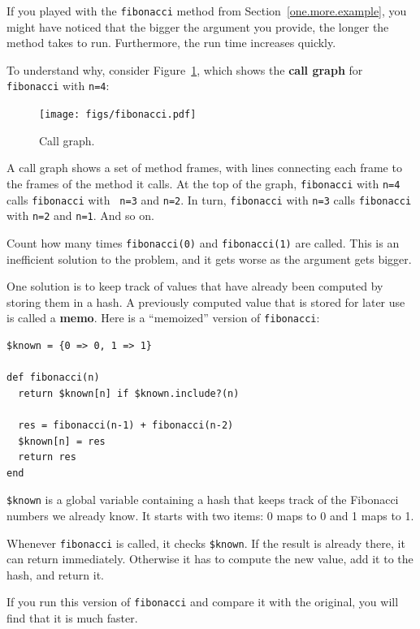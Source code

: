 \documentclass[10pt]{book}
\begin{document}
If you played with the {\tt fibonacci} method from
Section~\ref{one.more.example}, you might have noticed that the bigger
the argument you provide, the longer the method takes to run.
Furthermore, the run time increases quickly.

To understand why, consider Figure~\ref{fig.fibonacci}, which shows
the {\bf call graph} for {\tt fibonacci} with {\tt n=4}:

\begin{figure}
\centerline
{\texttt{[image: figs/fibonacci.pdf]}}
\caption{Call graph.}
\label{fig.fibonacci}
\end{figure}

A call graph shows a set of method frames, with lines connecting each
frame to the frames of the method it calls.  At the top of the
graph, {\tt fibonacci} with {\tt n=4} calls {\tt fibonacci} with {\tt
n=3} and {\tt n=2}.  In turn, {\tt fibonacci} with {\tt n=3} calls
{\tt fibonacci} with {\tt n=2} and {\tt n=1}.  And so on.

Count how many times {\tt fibonacci(0)} and {\tt fibonacci(1)} are
called.  This is an inefficient solution to the problem, and it gets
worse as the argument gets bigger.

One solution is to keep track of values that have already been
computed by storing them in a hash.  A previously computed value
that is stored for later use is called a {\bf memo}.  Here is a
``memoized'' version of {\tt fibonacci}:

\begin{verbatim}
$known = {0 => 0, 1 => 1}

def fibonacci(n)
  return $known[n] if $known.include?(n)

  res = fibonacci(n-1) + fibonacci(n-2)
  $known[n] = res
  return res
end
\end{verbatim}
%
{\tt \$known} is a global variable containing a
hash that keeps track of the Fibonacci
numbers we already know.  It starts with
two items: 0 maps to 0 and 1 maps to 1.

Whenever {\tt fibonacci} is called, it checks {\tt \$known}.
If the result is already there, it can return
immediately.  Otherwise it has to 
compute the new value, add it to the hash, and return it.

If you run this version of {\tt fibonacci} and compare it with
the original, you will find that it is much faster.
\end{document}
